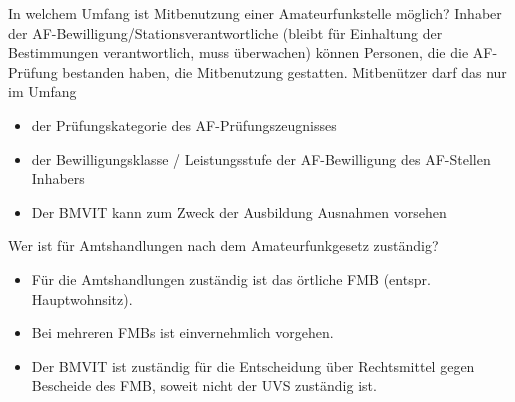 \documentclass[avery5371,grid,frame,a4paper]{flashcards}
\newcommand{\card}[3]{
  \begin{flashcard}[{\chap} -- #1]{#2}#3\end{flashcard}
}
\begin{document}
\card{35}{In welchem Umfang ist Mitbenutzung einer Amateurfunkstelle möglich?}{
  \small
  Inhaber der AF-Bewilligung/Stationsverantwortliche (bleibt für Einhaltung der Bestimmungen verantwortlich, muss überwachen) können Personen, die die AF-Prüfung bestanden haben, die Mitbenutzung gestatten. Mitbenützer darf das nur im Umfang
  \begin{itemize}
    \item der Prüfungskategorie des AF-Prüfungszeugnisses
    \item der Bewilligungsklasse / Leistungsstufe der AF-Bewilligung des AF-Stellen Inhabers
    \item Der BMVIT kann zum Zweck der Ausbildung Ausnahmen vorsehen
  \end{itemize}
}

\card{36}{Wer ist für Amtshandlungen nach dem Amateurfunkgesetz zuständig?}{
  \begin{itemize} 
    \item Für die Amtshandlungen zuständig ist das örtliche FMB (entspr. Hauptwohnsitz). 
    \item Bei mehreren FMBs ist einvernehmlich vorgehen. 
    \item Der BMVIT ist zuständig für die Entscheidung über Rechtsmittel gegen Bescheide des FMB, soweit nicht der UVS zuständig ist.
  \end{itemize}
}
\end{document}
